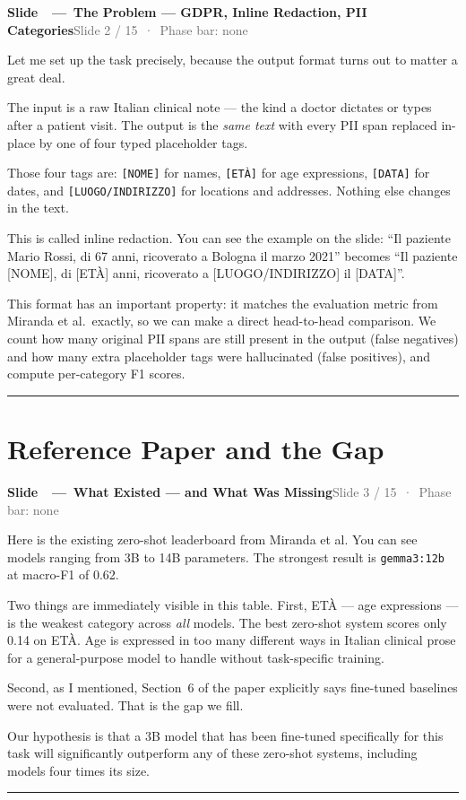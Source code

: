 \documentclass[11pt,a4paper]{article}
\newcounter{slidectr}
\newcommand{\slidescript}[3]{%
  \stepcounter{slidectr}
  \begin{slidebox}
    \noindent\textbf{Slide \theslidectr\ \,—\, #1}\hfill\small\textcolor{dimgray}{#2}
  \end{slidebox}
  \vspace{0.4em}
  #3
  \vspace{1.2em}
  \noindent\textcolor{dimgray!60}{\rule{\linewidth}{0.4pt}}
  \vspace{0.6em}
}
\begin{document}
\slidescript{The Problem — GDPR, Inline Redaction, PII Categories}{Slide 2 / 15 \,·\, Phase bar: none}{

Let me set up the task precisely, because the output format turns out to matter a great deal.

The input is a raw Italian clinical note — the kind a doctor dictates or types after a patient visit. The output is the \emph{same text} with every PII span replaced in-place by one of four typed placeholder tags.

Those four tags are: \texttt{[NOME]} for names, \texttt{[ETÀ]} for age expressions, \texttt{[DATA]} for dates, and \texttt{[LUOGO/INDIRIZZO]} for locations and addresses. Nothing else changes in the text.

This is called inline redaction. You can see the example on the slide: ``Il paziente Mario Rossi, di 67 anni, ricoverato a Bologna il marzo 2021'' becomes ``Il paziente [NOME], di [ETÀ] anni, ricoverato a [LUOGO/INDIRIZZO] il [DATA]''.

This format has an important property: it matches the evaluation metric from Miranda et al.\ exactly, so we can make a direct head-to-head comparison. We count how many original PII spans are still present in the output (false negatives) and how many extra placeholder tags were hallucinated (false positives), and compute per-category F1 scores.

}

\section{Reference Paper and the Gap}

\slidescript{What Existed — and What Was Missing}{Slide 3 / 15 \,·\, Phase bar: none}{

Here is the existing zero-shot leaderboard from Miranda et al. You can see models ranging from 3B to 14B parameters. The strongest result is \texttt{gemma3:12b} at macro-F1 of 0.62.

Two things are immediately visible in this table. First, ETÀ — age expressions — is the weakest category across \emph{all} models. The best zero-shot system scores only 0.14 on ETÀ. Age is expressed in too many different ways in Italian clinical prose for a general-purpose model to handle without task-specific training.

Second, as I mentioned, Section~6 of the paper explicitly says fine-tuned baselines were not evaluated. That is the gap we fill.

Our hypothesis is that a 3B model that has been fine-tuned specifically for this task will significantly outperform any of these zero-shot systems, including models four times its size.

}
\end{document}
